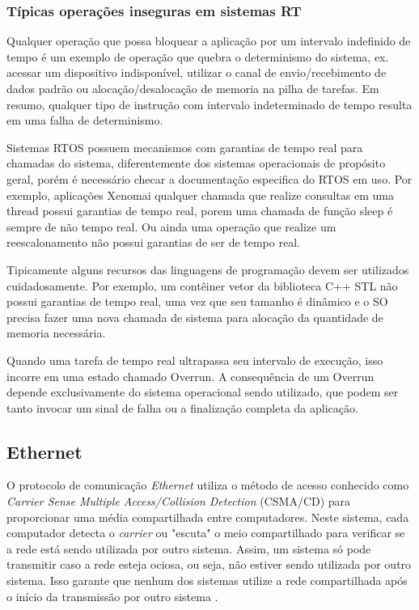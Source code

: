 \documentclass[conference]{IEEEtran}
\begin{document}
\subsubsection{Típicas operações inseguras em sistemas RT}\label{subsubsec:unsecure_operations_rtos}

Qualquer operação que possa bloquear a aplicação por um intervalo indefinido de tempo é um exemplo de operação que quebra o determinismo do sistema, ex. acessar um dispositivo indisponível, utilizar o canal de envio/recebimento de dados padrão ou alocação/desalocação de memoria na pilha de tarefas. Em resumo, qualquer tipo de instrução com intervalo indeterminado de tempo resulta em uma falha de determinismo.

Sistemas RTOS possuem mecanismos com garantias de tempo real para chamadas do sistema, diferentemente dos sistemas operacionais de propósito geral, porém é necessário checar a documentação especifica do RTOS em uso. Por exemplo, aplicações Xenomai qualquer chamada que realize consultas em uma thread possui garantias de tempo real, porem uma chamada de função sleep é sempre de não tempo real. Ou ainda uma operação que realize um reescalonamento não possui garantias de ser de tempo real.    

Tipicamente alguns recursos das linguagens de programação devem ser utilizados cuidadosamente. Por exemplo, um contêiner vetor da biblioteca C++ STL não possui garantias de tempo real, uma vez que seu tamanho é dinâmico e o SO precisa fazer uma nova chamada de sistema para alocação da quantidade de memoria necessária.

Quando uma tarefa de tempo real ultrapassa seu intervalo de execução, isso incorre em uma estado chamado Overrun. A consequência de um Overrun depende exclusivamente do sistema operacional sendo utilizado, que podem ser tanto invocar um sinal de falha ou a finalização completa da aplicação. 

\subsection{Ethernet}\label{subsec:ethernet}

O protocolo de comunicação \textit{Ethernet} utiliza o método de acesso conhecido como \textit{Carrier Sense Multiple Access/Collision Detection} (CSMA/CD) para proporcionar uma média compartilhada entre computadores. Neste sistema, cada computador detecta o \textit{carrier} ou "escuta" o meio compartilhado para verificar se a rede está sendo utilizada por outro sistema.	Assim, um sistema só pode transmitir caso a rede esteja ociosa, ou seja, não estiver sendo utilizada por outro sistema. Isso garante que nenhum dos sistemas utilize a rede compartilhada após o início da transmissão por outro sistema \cite{Spurgeon:2000:EDG:336070}.
\end{document}
